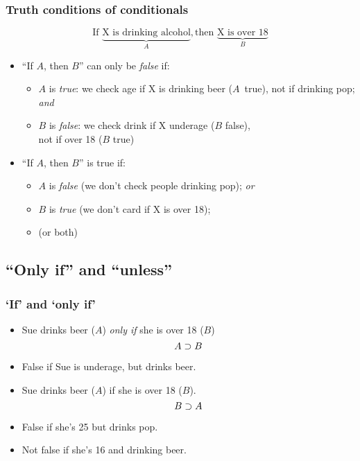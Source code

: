 
\begin{frame}
  \frametitle{Truth conditions of conditionals}

\[\text{If\ } \underbrace{\text{X is drinking alcohol}}_{A},
\text{then\ }\underbrace{\text{X is over 18}}_{B}\]

\begin{itemize}[<+->]
\item ``If $A$, then $B$'' can only be \emph{false} if:
\begin{itemize}
\item $A$ is \emph{true}: we check age if X is drinking beer ($A$~true), not if
 drinking pop; \emph{and}
\item $B$ is \emph{false}: we check drink if X underage ($B$ false),\\ not
if over 18 ($B$ true)
\end{itemize}
\item ``If $A$, then $B$'' is true if:
\begin{itemize}
\item $A$ is \emph{false} (we don't check people drinking pop); \emph{or}
\item $B$ is \emph{true} (we don't card if X is over 18);
\item (or both)
\end{itemize}
\end{itemize}
\end{frame}


\subsection{``Only if'' and ``unless''}

\begin{frame}
  \frametitle{`If' and `only if'}

\begin{itemize}[<+->]
  \item Sue drinks beer ($A$) \emph{only if} she is over 18 ($B$)
  \[
  A \supset B
  \]
  \item False if Sue is underage, but drinks beer.
  \item Sue drinks beer ($A$) if she is over 18 ($B$).
  \[
  B \supset A
  \]
  \item False if she's 25 but drinks pop.
  \item Not false if she's 16 and drinking beer.
\end{itemize}
\end{frame}

